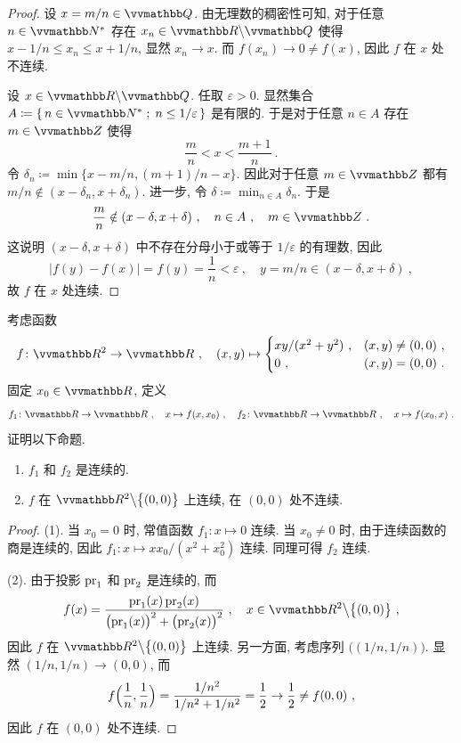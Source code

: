 \begin{proof}
    设 \(x = m / n \in \Q\). 由无理数的稠密性可知, 对于任意 \(n \in \N^\ast\) 存在 \(x_n \in \R \backslash \Q\) 使得 \(x - 1 / n \leq x_n \leq x + 1 / n\), 显然 \(x_n \to x\). 而 \(f(x_n) \to 0 \neq f(x)\), 因此 \(f\) 在 \(x\) 处不连续.

    设 \(x \in \R \backslash \Q\). 任取 \(\varepsilon > 0\). 显然集合 \(A \coloneqq \{\, n \in \N^\ast \;;\; n \leq 1 / \varepsilon \,\}\) 是有限的. 于是对于任意 \(n \in A\) 存在 \(m \in \Z\) 使得
    \[
        \frac{m}{n} < x < \frac{m + 1}{n}\ .
    \]
    令 \(\delta_n \coloneqq \min \bigl\{x - m / n, (m + 1) / n - x\bigr\}\). 因此对于任意 \(m \in \Z\) 都有 \(m / n \notin (x - \delta_n, x + \delta_n)\). 进一步, 令 \(\delta \coloneqq \min_{n \in A} \delta_n\). 于是
    \[
        \frac{m}{n} \notin (x - \delta, x + \delta)\ ,\quad n \in A\ ,\quad m \in \Z\ .
    \]
    这说明 \((x - \delta, x + \delta)\) 中不存在分母小于或等于 \(1 / \varepsilon\) 的有理数, 因此
    \[
        |f(y) - f(x)| = f(y) = \frac{1}{n} < \varepsilon\ ,\quad y = m / n \in (x - \delta, x + \delta)\ ,
    \]
    故 \(f\) 在 \(x\) 处连续.
\end{proof}

\begin{exercise}
    考虑函数
    \[
        f \colon \R^2 \to \R\ ,\quad (x, y) \mapsto
        \begin{cases}
            xy / (x^2 + y^2)\ , & (x, y) \neq (0, 0)\ , \\
            0\ ,                & (x, y) = (0, 0)\ .
        \end{cases}
    \]
    固定 \(x_0 \in \R\), 定义
    \[
        f_1 \colon \R \to \R\ ,\quad x \mapsto f(x, x_0)\ ,\quad f_2 \colon \R \to \R\ ,\quad x \mapsto f(x_0, x)\ .
    \]
    证明以下命题.
    \begin{enumerate}
        \item \(f_1\) 和 \(f_2\) 是连续的.
        \item \(f\) 在 \(\R^2 \big\backslash \bigl\{(0, 0)\bigr\}\) 上连续, 在 \((0, 0)\) 处不连续.
    \end{enumerate}
\end{exercise}

\begin{proof}
    (1). 当 \(x_0 = 0\) 时, 常值函数 \(f_1 \colon x \mapsto 0\) 连续. 当 \(x_0 \neq 0\) 时, 由于连续函数的商是连续的, 因此 \(f_1 \colon x \mapsto x x_0 / (x^2 + x_0^2)\) 连续. 同理可得 \(f_2\) 连续.

    (2). 由于投影 \(\operatorname{pr}_1\) 和 \(\operatorname{pr}_2\) 是连续的, 而
    \[
        f(x) = \frac{\pr_1(x) \pr_2(x)}{\bigl(\pr_1(x)\bigr)^2 + \bigl(\pr_2(x)\bigr)^2}\ ,\quad x \in \R^2 \big\backslash \bigl\{(0, 0)\bigr\}\ ,
    \]
    因此 \(f\) 在 \(\R^2 \big\backslash \bigl\{(0, 0)\bigr\}\) 上连续. 另一方面, 考虑序列 \(\bigl((1 / n, 1 / n)\bigr)\). 显然 \((1 / n, 1 / n) \to (0, 0)\), 而
    \[
        f\Bigl(\frac{1}{n}, \frac{1}{n}\Bigr) = \frac{1 / n^2}{1 / n^2 + 1 / n^2} = \frac{1}{2} \to \frac{1}{2} \neq f(0, 0)\ ,
    \]
    因此 \(f\) 在 \((0, 0)\) 处不连续.
\end{proof}


